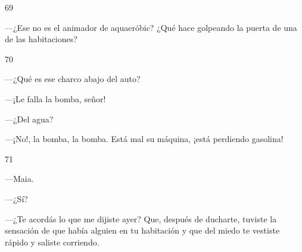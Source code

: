 \documentclass[12pt,twoside,openright,a5paper]{book}
\begin{document}
\vspace{0.5cm}

\hrulefill \hspace{0.1cm}\decofourleft\hspace{0.2cm} 69 \hspace{0.2cm}\decofourright \hspace{0.1cm}\hrulefill

\nopagebreak

\vspace{0.5cm}

\nopagebreak

---¿Ese no es el animador de aquaeróbic? ¿Qué hace golpeando la puerta
de una de las habitaciones?

\vspace{0.5cm}

\hrulefill \hspace{0.1cm}\decofourleft\hspace{0.2cm} 70 \hspace{0.2cm}\decofourright \hspace{0.1cm}\hrulefill

\nopagebreak

\vspace{0.5cm}

\nopagebreak

---¿Qué es ese charco abajo del auto?

---¡Le falla la bomba, señor!

---¿Del agua?

---¡No!, la bomba, la bomba. Está mal su máquina, ¡está perdiendo gasolina!

\vspace{0.5cm}

\hrulefill \hspace{0.1cm}\decofourleft\hspace{0.2cm} 71 \hspace{0.2cm}\decofourright \hspace{0.1cm}\hrulefill

\nopagebreak

\vspace{0.5cm}

\nopagebreak

---Maia.

---¿Sí?

---¿Te acordás lo que me dijiste ayer? Que, después de ducharte, tuviste la sensación de que había
alguien en tu habitación y que del miedo te vestiste
rápido y saliste corriendo.
\end{document}
